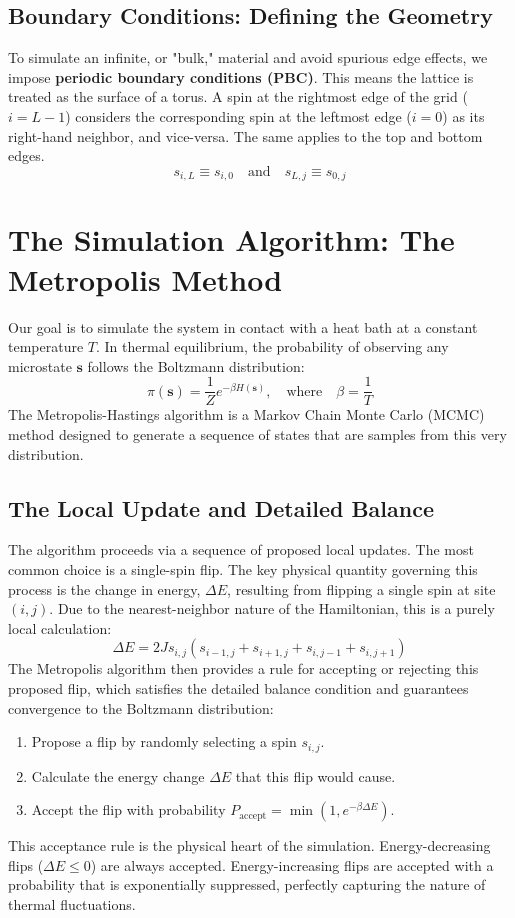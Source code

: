 \documentclass[10pt, letterpaper]{article}
\begin{document}
\subsection{Boundary Conditions: Defining the Geometry}
To simulate an infinite, or "bulk," material and avoid spurious edge effects, we impose \textbf{periodic boundary conditions (PBC)}. This means the lattice is treated as the surface of a torus. A spin at the rightmost edge of the grid ($i=L-1$) considers the corresponding spin at the leftmost edge ($i=0$) as its right-hand neighbor, and vice-versa. The same applies to the top and bottom edges.
$$
s_{i, L} \equiv s_{i, 0} \quad \text{and} \quad s_{L, j} \equiv s_{0, j}
$$

\section{The Simulation Algorithm: The Metropolis Method}

Our goal is to simulate the system in contact with a heat bath at a constant temperature $T$. In thermal equilibrium, the probability of observing any microstate $\mathbf{s}$ follows the Boltzmann distribution:
$$
\pi(\mathbf{s}) = \frac{1}{Z} e^{-\beta H(\mathbf{s})}, \quad \text{where} \quad \beta = \frac{1}{T}
$$
The Metropolis-Hastings algorithm is a Markov Chain Monte Carlo (MCMC) method designed to generate a sequence of states that are samples from this very distribution.

\subsection{The Local Update and Detailed Balance}
The algorithm proceeds via a sequence of proposed local updates. The most common choice is a single-spin flip. The key physical quantity governing this process is the change in energy, $\Delta E$, resulting from flipping a single spin at site $(i,j)$. Due to the nearest-neighbor nature of the Hamiltonian, this is a purely local calculation:
$$
\boxed{
\Delta E = 2 J s_{i,j} \left( s_{i-1,j} + s_{i+1,j} + s_{i,j-1} + s_{i,j+1} \right)
}
$$
The Metropolis algorithm then provides a rule for accepting or rejecting this proposed flip, which satisfies the detailed balance condition and guarantees convergence to the Boltzmann distribution:
\begin{enumerate}
    \item Propose a flip by randomly selecting a spin $s_{i,j}$.
    \item Calculate the energy change $\Delta E$ that this flip would cause.
    \item Accept the flip with probability $P_{\text{accept}} = \min\left(1, e^{-\beta \Delta E}\right)$.
\end{enumerate}
This acceptance rule is the physical heart of the simulation. Energy-decreasing flips ($\Delta E \le 0$) are always accepted. Energy-increasing flips are accepted with a probability that is exponentially suppressed, perfectly capturing the nature of thermal fluctuations.
\end{document}
